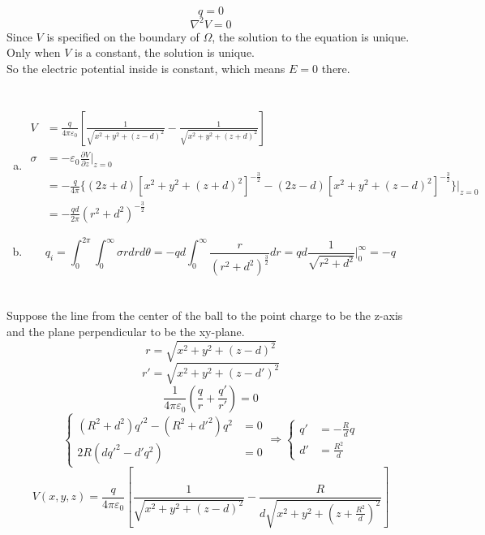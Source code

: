 \documentclass{article}
\begin{document}
\section{}
$$q=0$$
$$\nabla^2V=0$$
Since $V$ is specified on the boundary of $\Omega$, the solution to the equation is unique.\\
Only when $V$ is a constant, the solution is unique.\\
So the electric potential inside is constant, which means $E=0$ there.

\section{}
\begin{enumerate}[(a)]
\item
\begin{align*}
V&=\frac{q}{4\pi\varepsilon_0}\left[\frac{1}{\sqrt{x^2+y^2+(z-d)^2}}-\frac{1}{\sqrt{x^2+y^2+(z+d)^2}}\right]\\
\sigma&=-\varepsilon_0\frac{\partial V}{\partial z}\bigg|_{z=0}\\
&=-\frac{q}{4\pi}\lbrace(2z+d)[x^2+y^2+(z+d)^2]^{-\frac{3}{2}}-(2z-d)[x^2+y^2+(z-d)^2]^{-\frac{3}{2}}\rbrace\bigg|_{z=0}\\
&=-\frac{qd}{2\pi}(r^2+d^2)^{-\frac{3}{2}}
\end{align*}
\item
$$q_i=\int_0^{2\pi}\int_0^{\infty}\sigma rdrd\theta=-qd\int_0^{\infty}\frac{r}{(r^2+d^2)^{\frac{3}{2}}}dr=qd\frac{1}{\sqrt{r^2+d^2}}\bigg|_0^{\infty}=-q$$
\end{enumerate}

\section{}
Suppose the line from the center of the ball to the point charge to be the z-axis and the plane perpendicular to be the xy-plane.
$$r=\sqrt{x^2+y^2+(z-d)^2}$$
$$r'=\sqrt{x^2+y^2+(z-d')^2}$$
$$\frac{1}{4\pi\varepsilon_0}\left(\frac{q}{r}+\frac{q'}{r'}\right)=0$$
\begin{equation*}
\left\lbrace
\begin{array}{cc}
(R^2+d^2)q'^2-(R^2+d'^2)q^2&=0\\
2R(dq'^2-d'q^2)&=0
\end{array}
\right.\Rightarrow\left\lbrace
\begin{array}{cc}
q'&=-\frac{R}{d}q\\
d'&=\frac{R^2}{d}
\end{array}
\right.
\end{equation*}
$$V(x,y,z)=\frac{q}{4\pi\varepsilon_0}\left[\frac{1}{\sqrt{x^2+y^2+(z-d)^2}}-\frac{R}{d\sqrt{x^2+y^2+(z+\frac{R^2}{d})^2}}\right]$$
\end{document}
